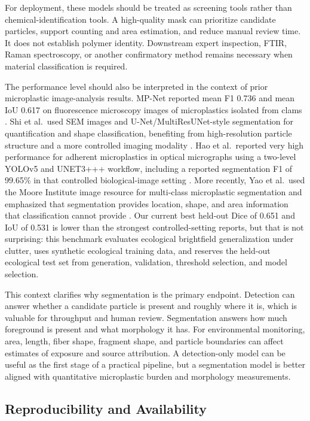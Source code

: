 \documentclass{article}
\begin{document}
For deployment, these models should be treated as screening tools rather than chemical-identification tools. A high-quality mask can prioritize candidate particles, support counting and area estimation, and reduce manual review time. It does not establish polymer identity. Downstream expert inspection, FTIR, Raman spectroscopy, or another confirmatory method remains necessary when material classification is required.

The performance level should also be interpreted in the context of prior microplastic image-analysis results. MP-Net reported mean F1 0.736 and mean IoU 0.617 on fluorescence microscopy images of microplastics isolated from clams \cite{park2022mpnet}. Shi et al.\ used SEM images and U-Net/MultiResUNet-style segmentation for quantification and shape classification, benefiting from high-resolution particle structure and a more controlled imaging modality \cite{shi2022sem}. Hao et al.\ reported very high performance for adherent microplastics in optical micrographs using a two-level YOLOv5 and UNET3+++ workflow, including a reported segmentation F1 of 99.65\% in that controlled biological-image setting \cite{hao2024}. More recently, Yao et al.\ used the Moore Institute image resource for multi-class microplastic segmentation and emphasized that segmentation provides location, shape, and area information that classification cannot provide \cite{yao2025}. Our current best held-out Dice of 0.651 and IoU of 0.531 is lower than the strongest controlled-setting reports, but that is not surprising: this benchmark evaluates ecological brightfield generalization under clutter, uses synthetic ecological training data, and reserves the held-out ecological test set from generation, validation, threshold selection, and model selection.

This context clarifies why segmentation is the primary endpoint. Detection can answer whether a candidate particle is present and roughly where it is, which is valuable for throughput and human review. Segmentation answers how much foreground is present and what morphology it has. For environmental monitoring, area, length, fiber shape, fragment shape, and particle boundaries can affect estimates of exposure and source attribution. A detection-only model can be useful as the first stage of a practical pipeline, but a segmentation model is better aligned with quantitative microplastic burden and morphology measurements.

\subsection{Reproducibility and Availability}
\end{document}
